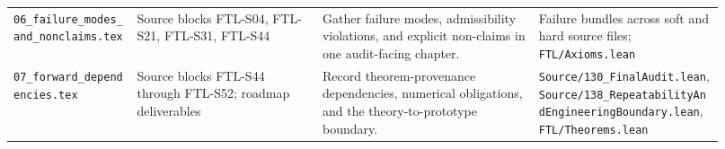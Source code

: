 \begin{longtable}{p{0.16\linewidth}p{0.24\linewidth}p{0.28\linewidth}p{0.24\linewidth}}
\texttt{06\_failure\_modes\_and\_nonclaims.tex} & Source blocks FTL-S04, FTL-S21, FTL-S31, FTL-S44 & Gather failure modes, admissibility violations, and explicit non-claims in one audit-facing chapter. & Failure bundles across soft and hard source files; \texttt{FTL/Axioms.lean} \\
\texttt{07\_forward\_dependencies.tex} & Source blocks FTL-S44 through FTL-S52; roadmap deliverables & Record theorem-provenance dependencies, numerical obligations, and the theory-to-prototype boundary. & \texttt{Source/130\_FinalAudit.lean}, \texttt{Source/138\_RepeatabilityAndEngineeringBoundary.lean}, \texttt{FTL/Theorems.lean} \\
\bottomrule
\end{longtable}
